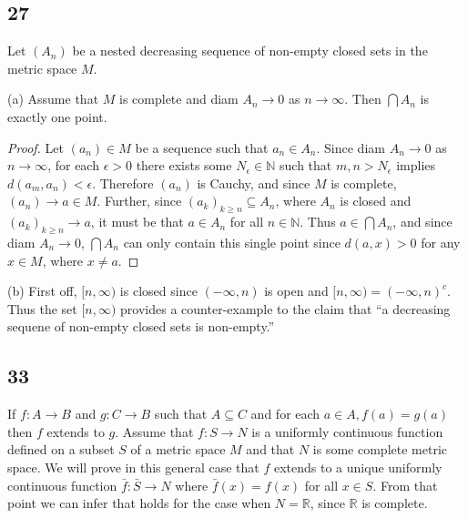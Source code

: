 \documentclass[11pt]{amsart}
\begin{document}
\subsection*{27} Let $(A_{n})$ be a nested decreasing sequence of non-empty closed sets in the metric space $M$.

(a) Assume that $M$ is complete and diam $A_{n}\rightarrow 0$ as $n\rightarrow \infty$. Then $\bigcap A_{n}$ is exactly one point.
\begin{proof}
  Let $(a_{n}) \in M$ be a sequence such that $a_{n} \in A_{n}$. Since diam $A_{n}\rightarrow 0$ as $n\rightarrow \infty$, for each $\epsilon > 0$ there exists some $N_{\epsilon}\in \mathbb{N}$ such that $m,n > N_{\epsilon}$ implies $d(a_{m}, a_{n}) < \epsilon$. Therefore $(a_{n})$ is Cauchy, and since $M$ is complete, $(a_{n})\rightarrow a\in M$. Further, since $(a_{k})_{k\geq n} \subseteq A_{n}$, where $A_{n}$ is closed and $(a_{k})_{k\geq n} \rightarrow a$, it must be that $a \in A_{n}$ for all $n\in\mathbb{N}$. Thus $a \in \bigcap A_{n}$, and since diam $A_{n} \rightarrow 0$, $\bigcap A_{n}$ can only contain this single point since $d(a,x) > 0$ for any $x\in M$, where $x \neq a$.
\end{proof}

(b) First off, $[n, \infty)$ is closed since $(-\infty, n)$ is open and $[n, \infty) = (-\infty, n)^{c}$. Thus the set $[n,\infty)$ provides a counter-example to the claim that ``a decreasing sequene of non-empty closed sets is non-empty.''



\subsection*{33} If $f : A \rightarrow B$ and $g : C \rightarrow B$ such that $A \subseteq C$ and for each $a \in A, f(a) = g(a)$ then $f$ extends to $g$. Assume that $f : S\rightarrow N$ is a uniformly continuous function defined on a subset $S$ of a metric space $M$ and that $N$ is some complete metric space. We will prove in this general case that $f$ extends to a unique uniformly continuous function $\bar{f} : \bar{S} \rightarrow N$ where $\bar{f}(x) = f(x)$ for all $x \in S$. From that point we can infer that holds for the case when $N = \mathbb{R}$, since $\mathbb{R}$ is complete.
\end{document}
